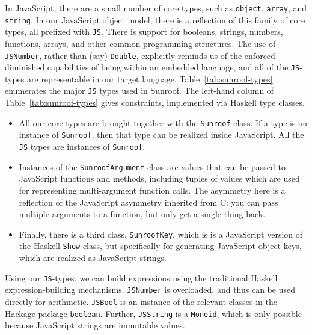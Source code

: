 \documentclass{llncs}
\newcommand{\Src}[1]{{\tt{#1}}}
\begin{document}
In JavaScript, there are a small number of core types, such as \Src{object}, \Src{array}, and \Src{string}.
In our JavaScript object model, there is a reflection of this family of core types, all prefixed with \Src{JS}.
There is support for booleans, strings, numbers, functions,
arrays, and other common programming structures.
The use of \Src{JSNumber}, rather than (say) \Src{Double},
explicitly reminds us of the enforced diminished capabilities of
being within an embedded language,
and all of the \Src{JS}-types are representable in our target language.
Table~\ref{tab:sunroof-types} enumerates the major \Src{JS} types used in Sunroof.
%
The left-hand column of Table~\ref{tab:sunroof-types} gives constraints,
implemented via Haskell type classes.
\begin{itemize}
\item  All our core types are brought together with the \Src{Sunroof} class.
If a type is an instance of \Src{Sunroof}, then that type can be realized inside JavaScript.
All the \Src{JS} types are instances of \Src{Sunroof}.

\item Instances of the \Src{SunroofArgument} class
are values that can be passed to JavaScript functions and methods,
including tuples of values which are used for representing multi-argument 
function calls.
The asymmetry here is a reflection of the JavaScript
asymmetry inherited from C: you can pass multiple arguments
to a function, but only get a single thing back.

\item Finally, there is a third class, \Src{SunroofKey}, which is
is a JavaScript version of the Haskell \Src{Show} class,
but specifically for generating JavaScript object keys,
which are realized as JavaScript strings.
\end{itemize}

Using our \Src{JS}-types, we can build expressions using the traditional Haskell expression-building
mechanisms. \Src{JSNumber} is overloaded, and thus can be used directly for arithmetic.
\Src{JSBool} is an instance of the relevant classes in the Hackage package \verb|boolean|.
Further, \Src{JSString} is a \Src{Monoid}, which is only possible because JavaScript
strings are immutable values.
\end{document}

